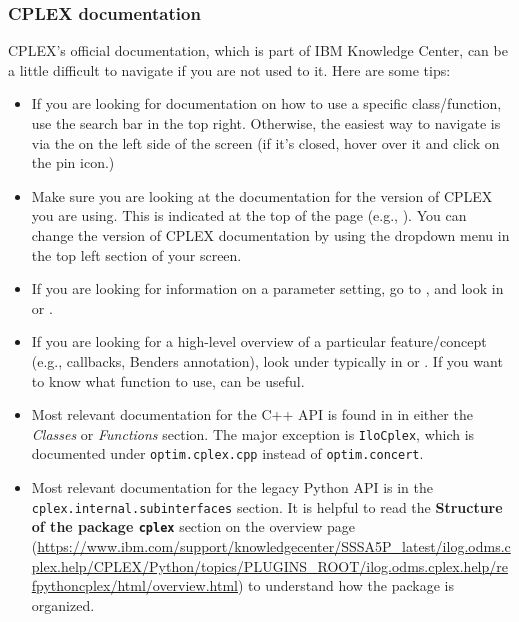 \documentclass[12pt]{article}
\begin{document}
\subsubsection{CPLEX documentation}
CPLEX's official documentation, which is part of IBM Knowledge Center, can be a little difficult to navigate if you are not used to it. Here are some tips:
\begin{itemize}
    \item If you are looking for documentation on how to use a specific class/function, use the search bar in the top right. Otherwise, the easiest way to navigate is via the  on the left side of the screen (if it's closed, hover over it and click on the pin icon.)
    \item Make sure you are looking at the documentation for the version of CPLEX you are using. This is indicated at the top of the page (e.g., ). You can change the version of CPLEX documentation by using the  dropdown menu in the top left section of your screen.
    \item If you are looking for information on a parameter setting, go to , and look in  or .
    \item If you are looking for a high-level overview of a particular feature/concept (e.g., callbacks, Benders annotation), look under  typically in  or . If you want to know what function to use,  can be useful.
    \item Most relevant documentation for the C++ API is found in  in either the \emph{Classes} or \emph{Functions} section. The major exception is \texttt{IloCplex}, which is documented under \texttt{optim.cplex.cpp} instead of \texttt{optim.concert}.
    \item Most relevant documentation for the legacy Python API is in the \texttt{cplex.\ttul internal.\ttul subinterfaces} section. It is helpful to read the \textbf{Structure of the package \texttt{cplex}} section on the overview page (\url{https://www.ibm.com/support/knowledgecenter/SSSA5P_latest/ilog.odms.cplex.help/CPLEX/Python/topics/PLUGINS_ROOT/ilog.odms.cplex.help/refpythoncplex/html/overview.html}) to understand how the package is organized.

\end{itemize}
\end{document}
